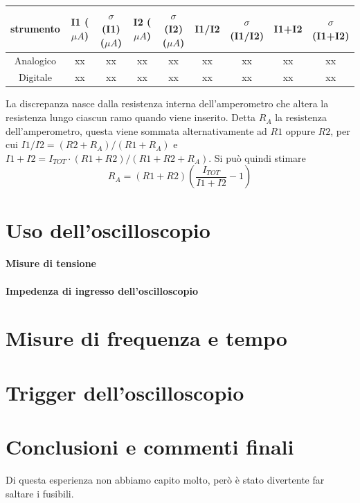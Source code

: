 \documentclass[10pt,a4paper]{article}
\begin{document}
\begin{center}
\begin{tabular}{|c|c|c|c|c|c|c|c|c|}
\hline 
strumento& I1 ($\mu A$)& $\sigma$(I1) ($\mu A$) & I2	($\mu A$) & $\sigma$(I2) ($\mu A$) & I1/I2 
& $\sigma$(I1/I2) & I1+I2 & $\sigma$(I1+I2) \\
\hline 
Analogico & xx & xx  & xx & xx & xx & xx & xx & xx \\
Digitale & xx & xx  & xx & xx & xx & xx & xx & xx \\
\hline 
\end{tabular} 
\end{center}

La discrepanza nasce dalla resistenza interna dell'amperometro che altera la 
resistenza lungo ciascun ramo quando viene inserito. Detta $R_A$ la resistenza dell'amperometro,
questa viene sommata alternativamente ad $R1$ oppure $R2$, per cui $I1/I2 = (R2+R_A)/(R1+R_A)$ 
e $I1+I2 = I_{TOT}\cdot(R1+R2)/(R1+R2+R_A)$.
Si pu\`o quindi stimare 
$$
R_A = (R1+R2)\left(\frac{I_{TOT}}{I1+I2} - 1 \right)
$$


\section{Uso dell'oscilloscopio}

\paragraph{Misure di tensione}

\paragraph{Impedenza di ingresso dell'oscilloscopio}

\section{Misure di frequenza e tempo}

\section{Trigger dell'oscilloscopio}

\section{Conclusioni e commenti finali}
Di questa esperienza non abbiamo capito molto, per\`o \`e stato divertente far saltare i fusibili. 
\end{document}
